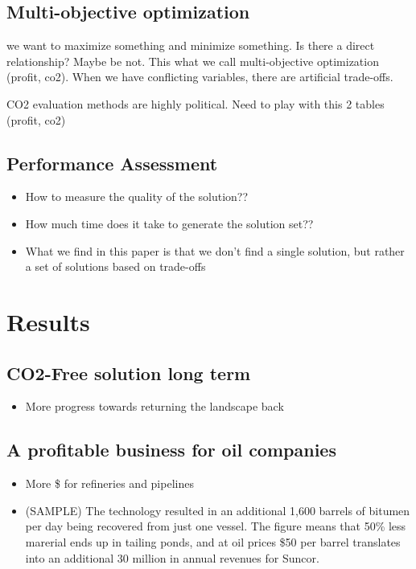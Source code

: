 \documentclass[12pt]{article}
\begin{document}
\subsection{Multi-objective optimization}
we want to maximize something and minimize something. Is there a direct relationship?
Maybe be not. This what we call multi-objective optimization (profit, co2). When we have conflicting variables, there are artificial trade-offs. 

CO2 evaluation methods are highly political. Need to play with this 2 tables (profit, co2)

\subsection{Performance Assessment}
\begin{itemize}
\item How to measure the quality of the solution?? 
\item How much time does it take to generate the solution set??
\item What we find in this paper is that we don't find a single solution, but rather a set of solutions based on trade-offs
\end{itemize}


\section{Results}
\subsection{CO2-Free solution long term}
\begin{itemize}
\item More progress towards returning the landscape back
\end{itemize}


\subsection{A profitable business for oil companies}
\begin{itemize}
\item More \$ for refineries and pipelines
\item (SAMPLE) The technology resulted in an additional 1,600 barrels of bitumen per day being recovered from just one vessel. The figure means that 50\% less marerial ends up in tailing ponds, and at oil prices \$50 per barrel translates into an additional 30 million in annual revenues for Suncor. 
\end{itemize}
\end{document}
